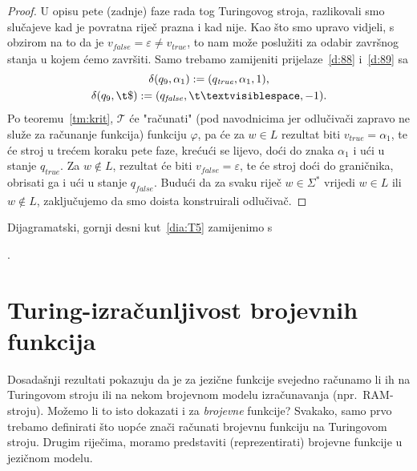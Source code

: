 \begin{proof}
U opisu pete (zadnje) faze rada tog Turingovog stroja, razlikovali smo slučajeve kad je povratna riječ prazna i kad nije. Kao što smo upravo vidjeli, s obzirom na to da je $v_\mathit{false}=\varepsilon\not=v_\mathit{true}$, to nam može poslužiti za odabir završnog stanja u kojem ćemo završiti. Samo trebamo zamijeniti prijelaze~\eqref{d:88} i~\eqref{d:89} sa
\begin{gather}
\label{eq:d88j}
    \delta(q_9,\alpha_1):=(q_\mathit{true},\alpha_1,1)\text,\\
\label{eq:d89j}
    \delta(q_9,\t\$):=(q_\mathit{false},\bl,-1)\text.
\end{gather}
Po teoremu~\ref{tm:krit}, $\mathcal T$ će "računati" (pod navodnicima jer odlučivači zapravo ne služe za računanje funkcija) funkciju $\varphi$, pa će za $w\in L$ rezultat biti $v_\mathit{true}=\alpha_1$, te će stroj u trećem koraku pete faze, krećući se lijevo, doći do znaka $\alpha_1$ i ući u stanje $q_\mathit{true}$. Za $w\not\in L$, rezultat će biti $v_\mathit{false}=\varepsilon$, te će stroj doći do graničnika, obrisati ga i ući u stanje $q_\mathit{false}$. Budući da za svaku riječ $w\in\Sigma^*$ vrijedi $w\in L$ ili $w\not\in L$, zaključujemo da smo doista konstruirali odlučivač.
\end{proof}

Dijagramatski, gornji desni kut~\eqref{dia:T5} zamijenimo s\quad {}.

\section{Turing-izračunljivost brojevnih funkcija}

Dosadašnji rezultati pokazuju da je za jezične funkcije svejedno računamo li ih na Turingovom stroju ili na nekom brojevnom modelu izračunavanja (npr.\ RAM-stroju). Možemo li to isto dokazati i za \emph{brojevne} funkcije? Svakako, samo prvo trebamo definirati što uopće znači računati brojevnu funkciju na Turingovom stroju. Drugim riječima, moramo predstaviti (reprezentirati) brojevne funkcije u jezičnom modelu.

